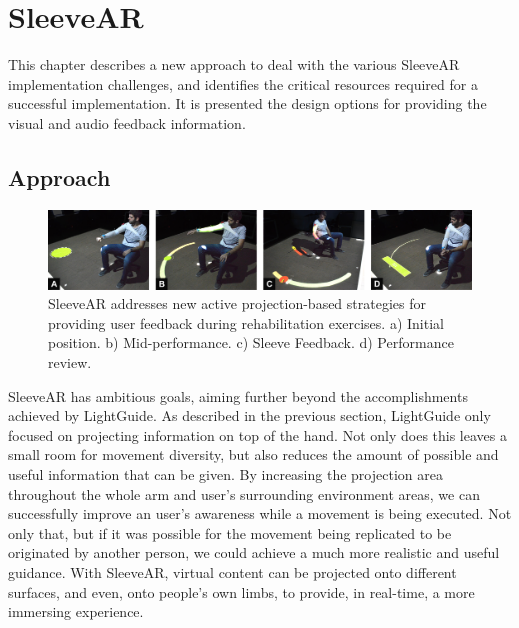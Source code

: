 \chapter{SleeveAR}
\label{sec:sleevear}


This chapter describes a new approach to deal with the various SleeveAR implementation challenges, and  identifies the critical resources required for a successful implementation. It is presented the design options for providing the visual and audio feedback information.




\section{Approach}
\label{sec:sleevear:approach}

\begin{figure}[!t]
    \begin{center}
        \includegraphics[width=\textwidth]{imgs/impl/teaser.jpg}
    \end{center}
    \caption{SleeveAR addresses new active projection-based strategies for providing user feedback during rehabilitation exercises. a) Initial position. b) Mid-performance. c) Sleeve Feedback. d) Performance review.}
    \label{fig:teaser}
\end{figure}

SleeveAR has ambitious goals, aiming further beyond the accomplishments achieved by LightGuide. 
As described in the previous section, LightGuide only focused on projecting information on top of the hand. Not only does this leaves a small room for movement diversity, but also reduces the amount of possible and useful information that can be given.
By increasing the projection area throughout the whole arm and user's surrounding environment areas, we can successfully improve an user's awareness while a movement is being executed. 
 Not only that, but if it was possible for the movement being replicated to be originated by another person, we could achieve a much more realistic and useful guidance.
With SleeveAR, virtual content can be projected onto different surfaces, and even, onto people's own limbs, to provide, in real-time, a more immersing experience. 

